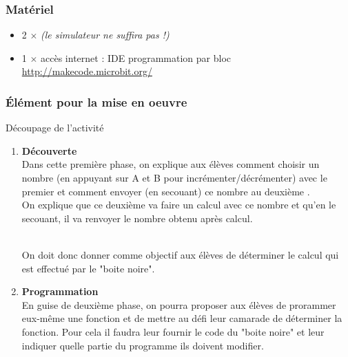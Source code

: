 \subsubsection{Matériel}
\begin{itemize}
    \item 2 $\times$ \matosMb \emph{(le simulateur ne suffira pas !)}
    \item 1 $\times$ accès internet : IDE programmation par bloc \url{http://makecode.microbit.org/}

\end{itemize}


\newpage

\subsubsection{Élément pour la mise en oeuvre}

\begin{methode}
    Découpage de l'activité

    \begin{enumerate}
        \item \textbf{Découverte} \\
            Dans cette première phase, on explique aux élèves comment choisir un nombre 
            (en appuyant sur A et B pour incrémenter/décrémenter) avec le premier \mb et 
            comment envoyer (en secouant) ce nombre au deuxième \mb.\\
            On explique que ce deuxième \mb va faire un calcul avec ce nombre et qu'en le secouant, il 
            va renvoyer le nombre obtenu après calcul.\\~

            On doit donc donner comme objectif aux élèves de déterminer le calcul qui est effectué par le \mb "boite noire".
            

        \item \textbf{Programmation}\\
            En guise de deuxième phase, on pourra proposer aux élèves de prorammer eux-même une fonction
            et de mettre au défi leur camarade de déterminer la fonction. Pour cela il faudra leur fournir 
            le code du \mb "boite noire" et leur indiquer quelle partie du programme ils doivent modifier.
    
    \end{enumerate}
\end{methode}


